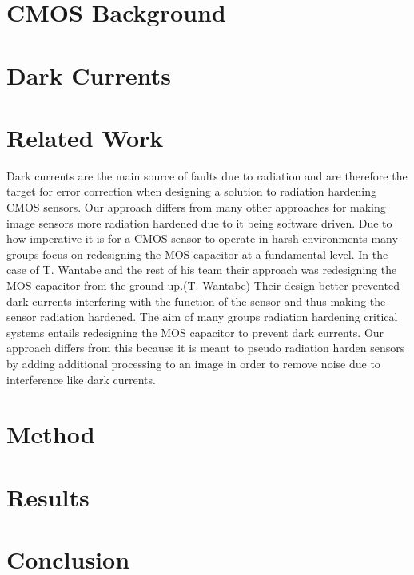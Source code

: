 \documentclass[journal]{IEEEtran}
\begin{document}
\section{CMOS Background}




\section{Dark Currents}



\section{Related Work} 
Dark currents are the main source of faults due to radiation and are therefore the target for error correction when designing a solution to radiation hardening CMOS sensors.  Our approach differs from many other approaches for making image sensors more radiation hardened due to it being software driven.  Due to how imperative it is for a CMOS sensor to operate in harsh environments many groups focus on redesigning the MOS capacitor at a fundamental level.  In the case of T. Wantabe and the rest of his team their approach was redesigning the MOS capacitor from the ground up.(T. Wantabe)  Their design better prevented dark currents interfering with the function of the sensor and thus making the sensor radiation hardened.  The aim of many groups radiation hardening critical systems entails redesigning the MOS capacitor to prevent dark currents.  Our approach differs from this because it is meant to pseudo radiation harden sensors by adding additional processing to an image in order to remove noise due to interference like dark currents.  

\section{Method}

\section{Results}

\section{Conclusion}



{\footnotesize

}
\end{document}
